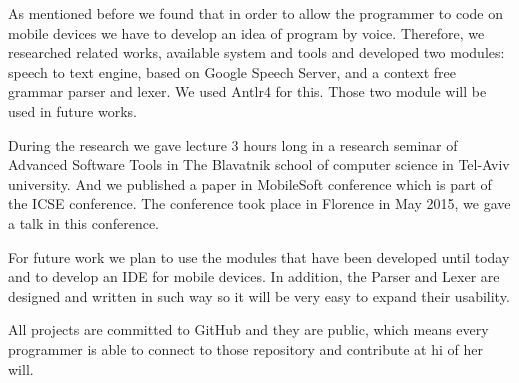 As mentioned before we found that in order to allow the programmer to code on mobile devices we have to develop an idea of program by voice. Therefore, we researched related works, available system and tools and developed two modules: speech to text engine, based on Google Speech Server, and a context free grammar parser and lexer. We used Antlr4 for this. Those two module will be used in future works.

During the research we gave lecture 3 hours long in a research seminar of Advanced Software Tools in The Blavatnik school of computer science in Tel-Aviv university. And we published a paper in MobileSoft conference which is part of the ICSE conference. The conference took place in Florence in May 2015, we gave a talk in this conference.

For future work we plan to use the modules that have been developed until today and to develop an IDE for mobile devices. In addition, the Parser and Lexer are designed and written in such way so it will be very easy to expand their usability.

All projects are committed to GitHub and they are public, which means every programmer is able to connect to those repository and contribute at hi of her will.